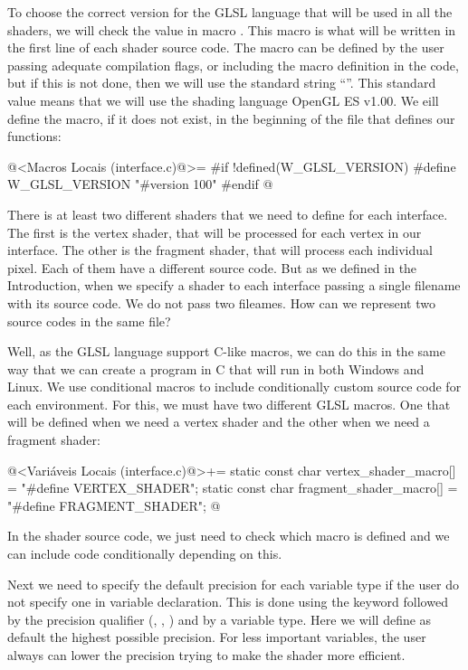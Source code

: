 To choose the correct version for the GLSL language that will be used
in all the shaders, we will check the value in macro
. This macro is what will be written in
the first line of each shader source code. The macro can be defined by
the user passing adequate compilation flags, or including the macro
definition in the code, but if this is not done, then we will use the
standard string ``''. This standard value
means that we will use the shading language OpenGL ES v1.00. We eill
define the macro, if it does not exist, in the beginning of the file
that defines our functions:

\iniciocodigo
@<Macros Locais (interface.c)@>=
#if !defined(W_GLSL_VERSION)
#define W_GLSL_VERSION "#version 100\n"
#endif
@
\fimcodigo

There is at least two different shaders that we need to define for
each interface. The first is the vertex shader, that will be processed
for each vertex in our interface. The other is the fragment shader,
that will process each individual pixel. Each of them have a different
source code. But as we defined in the Introduction, when we specify a
shader to each interface passing a single filename with its source
code. We do not pass two fileames. How can we represent two source
codes in the same file?

Well, as the GLSL language support C-like macros, we can do this in
the same way that we can create a program in C that will run in both
Windows and Linux. We use conditional macros to include conditionally
custom source code for each environment. For this, we must have two
different GLSL macros. One that will be defined when we need a vertex
shader and the other when we need a fragment shader:

\iniciocodigo
@<Variáveis Locais (interface.c)@>+=
static const char vertex_shader_macro[] = "#define VERTEX_SHADER\n";
static const char fragment_shader_macro[] = "#define FRAGMENT_SHADER\n";
@
\fimcodigo

In the shader source code, we just need to check which macro is
defined and we can include code conditionally depending on this.

Next we need to specify the default precision for each variable type
if the user do not specify one in variable declaration. This is done
using the keyword  followed by the precision
qualifier (, ,
) and by a variable type. Here we will define as
default the highest possible precision. For less important variables,
the user always can lower the precision trying to make the shader more
efficient.


